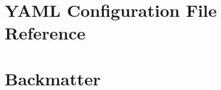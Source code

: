 \documentclass[a4paper]{report}
\begin{document}
	\part{YAML Configuration File Reference}
	
	


	\part{Backmatter}
	\printglossary[title=Terms Used, toctitle=List of Terms]

	\printglossary[type=\acronymtype]

	\printglossaries
	\glsaddallunused

	
	
	
	


    

	\printindex
	\lstlistoflistings
\end{document}
